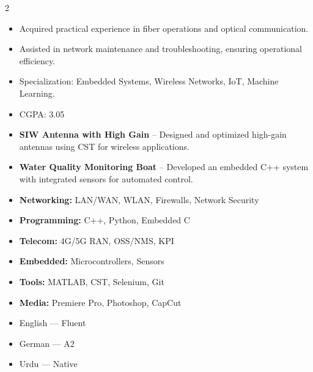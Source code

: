 \documentclass[10pt,a4paper,ragged2e,withhyper]{altacv}
\begin{document}
\begin{paracol}{2}
\divider

\begin{itemize}
\item Acquired practical experience in fiber operations and optical communication.
\item Assisted in network maintenance and troubleshooting, ensuring operational efficiency.
\end{itemize}


\switchcolumn


\begin{itemize}
\item Specialization: Embedded Systems, Wireless Networks, IoT, Machine Learning.
\end{itemize}

\divider

\begin{itemize}
\item CGPA: 3.05
\end{itemize}


\begin{itemize}
\item \textbf{SIW Antenna with High Gain} – Designed and optimized high-gain antennas using CST for wireless applications.
\item \textbf{Water Quality Monitoring Boat} – Developed an embedded C++ system with integrated sensors for automated control.
\end{itemize}


\begin{itemize}[label={}]
\item \textbf{Networking:} LAN/WAN, WLAN, Firewalls, Network Security
\item \textbf{Programming:} C++, Python, Embedded C
\item \textbf{Telecom:} 4G/5G RAN, OSS/NMS, KPI
\item \textbf{Embedded:} Microcontrollers, Sensors
\item \textbf{Tools:} MATLAB, CST, Selenium, Git
\item \textbf{Media:} Premiere Pro, Photoshop, CapCut
\end{itemize}


\begin{itemize}[label={}]
\item English --- Fluent
\item German --- A2
\item Urdu --- Native
\end{itemize}

\end{paracol}
\end{document}
